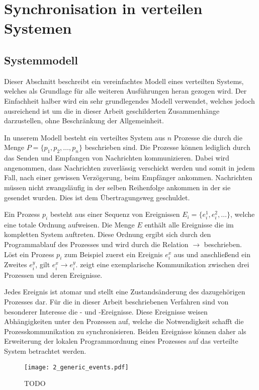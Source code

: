\section{Synchronisation in verteilen Systemen}
\label{cap:Uhrenarten}
\subsection{Systemmodell}
Dieser Abschnitt beschreibt ein vereinfachtes Modell eines verteilten Systems, welches als Grundlage für alle weiteren Ausführungen heran gezogen wird.
Der Einfachheit halber wird ein sehr grundlegendes Modell verwendet, welches jedoch ausreichend ist um die in dieser Arbeit geschilderten Zusammenhänge darzustellen, ohne Beschränkung der Allgemeinheit.

In unserem Modell besteht ein verteiltes System aus $n$ Prozesse die durch die Menge $P=\{p_1, p_2,\ldots, p_n\}$ beschrieben sind.
Die Prozesse können lediglich durch das Senden und Empfangen von Nachrichten kommunizieren.
Dabei wird angenommen, dass Nachrichten zuverlässig verschickt werden und somit in jedem Fall, nach einer gewissen Verzögerung, beim Empfänger ankommen.
Nachrichten müssen nicht zwangsläufig in der selben Reihenfolge ankommen in der sie gesendet wurden.
Dies ist dem Übertragungsweg geschuldet.

Ein Prozess $p_i$ besteht aus einer Sequenz von Ereignissen $E_i=\{e_i^1, e_i^2, \ldots\}$, welche eine totale Ordnung aufweisen.
Die Menge $E$ enthält alle Ereignisse die im kompletten System auftreten.
Diese Ordnung ergibt sich durch den Programmablauf des Prozesses und wird durch die Relation $\rightarrow$ beschrieben.
Löst ein Prozess $p_i$ zum Beispiel zuerst ein Ereignis $e_i^x$ aus und anschließend ein Zweites $e_i^y$, gilt $e_i^x \rightarrow e_i^y$.  zeigt eine exemplarische Kommunikation zwischen drei Prozessen und deren Ereignisse.

Jedes Ereignis ist atomar und stellt eine Zustandsänderung des dazugehörigen Prozesses dar.
Für die in dieser Arbeit beschriebenen Verfahren sind von besonderer Interesse die - und -Ereignisse.
Diese Ereignisse weisen Abhängigkeiten unter den Prozessen auf, welche die Notwendigkeit schafft die Prozesskommunikation zu synchronisieren.
Beiden Ereignisse können daher als Erweiterung der lokalen Programmordnung eines Prozesses auf das verteilte System betrachtet werden.

\begin{figure}[ht]
    \centering
    \texttt{[image: 2\_generic\_events.pdf]}
    \caption[Beispiel einer beliebigen Kommunikation]{TODO}
    \label{fig:genericEvents}
\end{figure}

